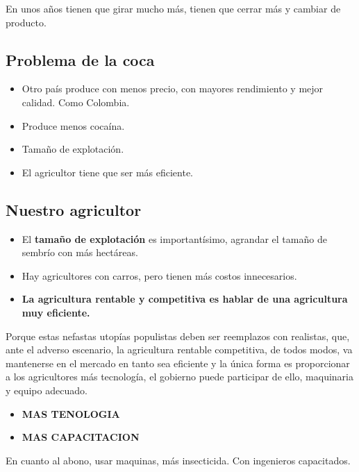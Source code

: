 \documentclass[
  a4paper,
]{article}
\begin{document}
En unos años tienen que girar mucho más, tienen que cerrar más y cambiar
de producto.

\hypertarget{problema-de-la-coca}{%
\subsection{Problema de la coca}\label{problema-de-la-coca}}

\begin{itemize}
\item
  Otro país produce con menos precio, con mayores rendimiento y mejor
  calidad. Como Colombia.
\item
  Produce menos cocaína.
\item
  Tamaño de explotación.
\item
  El agricultor tiene que ser más eficiente.
\end{itemize}

\hypertarget{nuestro-agricultor}{%
\subsection{Nuestro agricultor}\label{nuestro-agricultor}}

\begin{itemize}
\item
  El \textbf{tamaño de explotación} es importantísimo, agrandar el
  tamaño de sembrío con más hectáreas.
\item
  Hay agricultores con carros, pero tienen más costos innecesarios.
\item
  \textbf{La agricultura rentable y competitiva es hablar de una
  agricultura muy eficiente.}
\end{itemize}

Porque estas nefastas utopías populistas deben ser reemplazos con
realistas, que, ante el adverso escenario, la agricultura rentable
competitiva, de todos modos, va mantenerse en el mercado en tanto sea
eficiente y la única forma es proporcionar a los agricultores más
tecnología, el gobierno puede participar de ello, maquinaria y equipo
adecuado.

\begin{itemize}
\item
  \textbf{MAS TENOLOGIA}
\item
  \textbf{MAS CAPACITACION}
\end{itemize}

En cuanto al abono, usar maquinas, más insecticida. Con ingenieros
capacitados.
\end{document}
